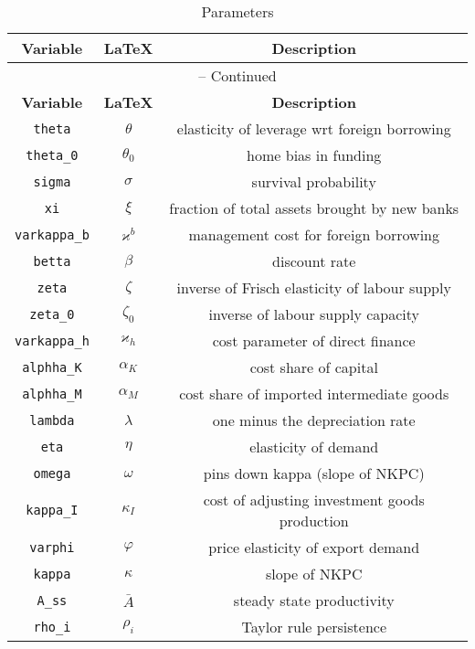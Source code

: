 \begin{center}
\begin{longtable}{ccc}
\caption{Parameters}\\%
\hline%
\multicolumn{1}{c}{\textbf{Variable}} &
\multicolumn{1}{c}{\textbf{\LaTeX}} &
\multicolumn{1}{c}{\textbf{Description}}\\%
\hline\hline%
\endfirsthead
\multicolumn{3}{c}{{\tablename} \thetable{} -- Continued}\\%
\hline%
\multicolumn{1}{c}{\textbf{Variable}} &
\multicolumn{1}{c}{\textbf{\LaTeX}} &
\multicolumn{1}{c}{\textbf{Description}}\\%
\hline\hline%
\endhead
\texttt{theta} & $\theta$ & elasticity of leverage wrt foreign borrowing\\
\texttt{theta\_0} & $\theta_{0}$ & home bias in funding\\
\texttt{sigma} & $\sigma$ & survival probability\\
\texttt{xi} & $\xi$ & fraction of total assets brought by new banks\\
\texttt{varkappa\_b} & $\varkappa^{b}$ & management cost for foreign borrowing\\
\texttt{betta} & $\beta$ & discount rate\\
\texttt{zeta} & $\zeta$ & inverse of Frisch elasticity of labour supply\\
\texttt{zeta\_0} & $\zeta_{0}$ & inverse of labour supply capacity\\
\texttt{varkappa\_h} & $\varkappa_{h}$ & cost parameter of direct finance\\
\texttt{alphha\_K} & $\alpha_{K}$ & cost share of capital\\
\texttt{alphha\_M} & $\alpha_{M}$ & cost share of imported intermediate goods\\
\texttt{lambda} & $\lambda$ & one minus the depreciation rate\\
\texttt{eta} & $\eta$ & elasticity of demand\\
\texttt{omega} & $\omega$ & pins down kappa (slope of NKPC)\\
\texttt{kappa\_I} & $\kappa_{I}$ & cost of adjusting investment goods production\\
\texttt{varphi} & $\varphi$ & price elasticity of export demand\\
\texttt{kappa} & $\kappa$ & slope of NKPC\\
\texttt{A\_ss} & $\bar{A}$ & steady state productivity\\
\texttt{rho\_i} & $\rho_{i}$ & Taylor rule persistence\\

\end{longtable}
\end{center}
